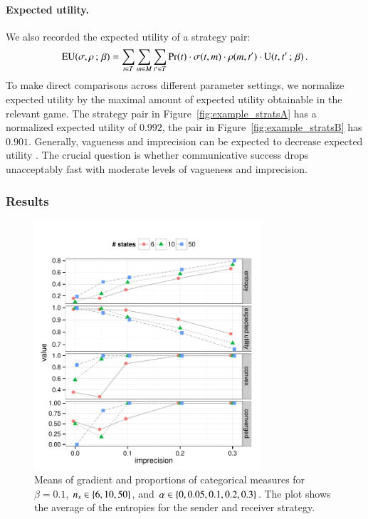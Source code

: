 \documentclass[fleqn,reqno,10pt]{article}
\newcommand{\impairment}{\ensuremath{\alpha}} %
\newcommand{\toler}{\ensuremath{\beta}} %
\newcommand{\ns}{\ensuremath{n_s}} %
\begin{document}
\paragraph{Expected utility.} We also recorded the expected utility of
a strategy pair:
\begin{align*}
  \EU(\Sstrat,\Rstrat \myts ; \myts \toler) = \sum_{\state \in
    \States} \sum_{\messg \in \Messgs} \sum_{\state' \in \States}
  \Pr(\state) \cdot \Sstrat(\state, \messg) \cdot \Rstrat(\messg,
  \state') \cdot \Util(\state,\state' \myts ; \myts \toler)\,.
\end{align*}
To make direct comparisons across different parameter settings, we
normalize expected utility by the maximal amount of expected utility
obtainable in the relevant game. The strategy pair in
Figure~\ref{fig:example_stratsA} has a normalized expected utility of
$0.992$, the pair in Figure~\ref{fig:example_stratsB} has
$0.901$. Generally, vagueness and imprecision can be expected to
decrease expected utility
\citep[c.f.][]{Lipman2009:Why-is-Language}. The crucial question is
whether communicative success drops unacceptably fast with moderate
levels of vagueness and imprecision.

\subsubsection{Results}

\begin{figure}[t]
  \centering
  
  \includegraphics[width=0.75\textwidth]{plots/MeanMetrics3.pdf}

  \caption{Means of gradient and proportions of categorical measures
    for $\toler = 0.1$, $\ns \in \set{6, 10, 50}$, and $\impairment
    \in \set{0, 0.05, 0.1, 0.2, 0.3}$. The plot shows the average of
    the entropies for the sender and receiver strategy.}
  \label{fig:MeanMetrics}
\end{figure}
\end{document}

